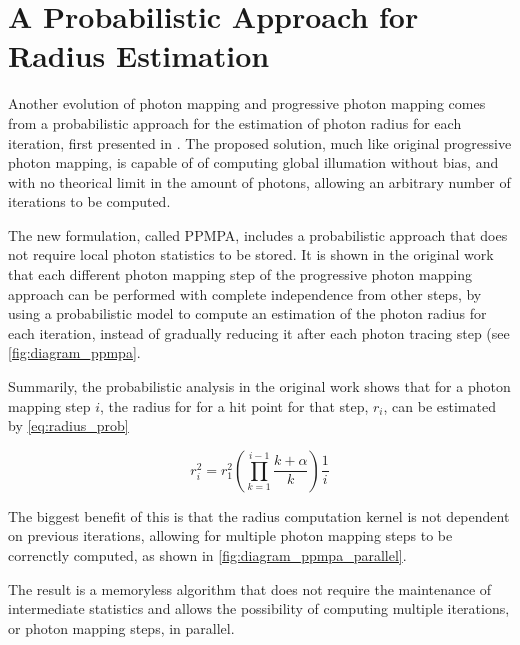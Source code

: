 \documentclass[main.tex]{subfiles}
\begin{document}
\section{A Probabilistic Approach for Radius Estimation} \label{section:ppmpa}


Another evolution of photon mapping and progressive photon mapping comes from a probabilistic approach for the estimation of photon radius for each iteration, first presented in \cite{knaus2011progressive}. The proposed solution, much like original progressive photon mapping, is capable of of computing global illumation without bias, and with no theorical limit in the amount of photons, allowing an arbitrary number of iterations to be computed.

The new formulation, called PPMPA, includes a probabilistic approach that does not require local photon statistics to be stored. It is shown in the original work that each different photon mapping step of the progressive photon mapping approach can be performed with complete independence from other steps, by using a probabilistic model to compute an estimation of the photon radius for each iteration, instead of gradually reducing it after each photon tracing step (see \cref{fig:diagram_ppmpa}.


Summarily, the probabilistic analysis in the original work shows that for a photon mapping step $i$, the radius for for a hit point for that step, $r_{i}$, can be estimated by \cref{eq:radius_prob}

\begin{figure}[!htp]
  \begin{equation}
    r^{2}_{i} = r^{2}_{1} (\prod\limits^{i-1}_{k=1} \frac{k + \alpha}{k}) \frac{1}{i}
  \label{eq:radius_prob}
  \end{equation}
\end{figure}


The biggest benefit of this is that the radius computation kernel is not dependent on previous iterations, allowing for multiple photon mapping steps to be correnctly computed, as shown in \cref{fig:diagram_ppmpa_parallel}.


The result is a memoryless algorithm that does not require the maintenance of intermediate statistics and allows the possibility of computing multiple iterations, or photon mapping steps, in parallel.

\end{document}
